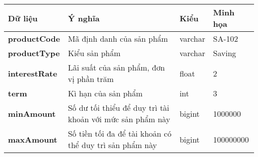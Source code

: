 \begin{center}
    \begin{tabular}{ | m{9em} | m{15em}| m{5em} | m{5em} | } 
    \hline
    \rowcolor{gray!30}
    Dữ liệu & Ý nghĩa & Kiểu & Minh họa \\ 

    \hline
    \textbf{productCode} &
    Mã định danh của sản phẩm &
    varchar &
    SA-102 \\

    \hline
    \textbf{productType} &
    Kiểu sản phẩm &
    varchar &
    Saving \\

    \hline
    \textbf{interestRate} &
    Lãi suất của sản phẩm, đơn vị phần trăm &
    float &
    2 \\

    \hline
    \textbf{term} &
    Kì hạn của sản phẩm  &
    int &
    3 \\

    \hline
    \textbf{minAmount} &
    Số dư tối thiểu để duy trì tài khoản với mức sản phẩm này &
    bigint &
    1000000 \\

    \hline
    \textbf{maxAmount} &
    Số tiền tối đa để tài khoản có thể duy trì sản phẩm này &
    bigint &
    100000000 \\
    
    \hline
    \end{tabular}
\end{center}